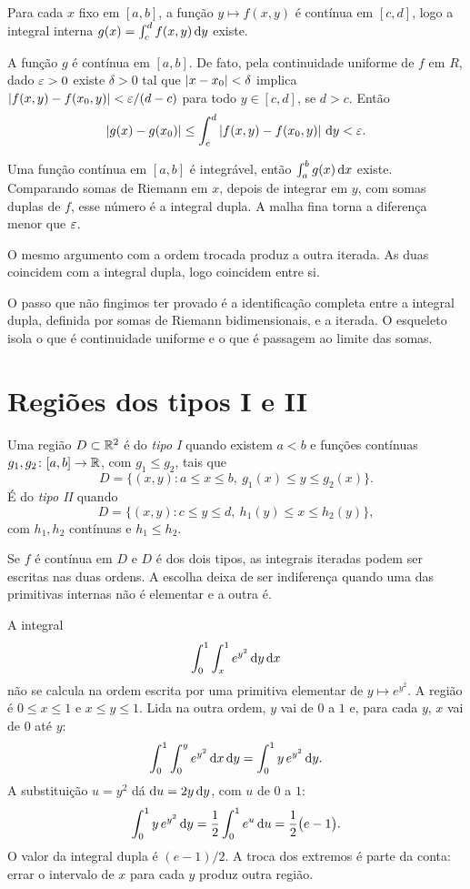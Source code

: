 \documentclass[11pt,a4paper]{article}
\begin{document}
\begin{esqueleto}
\item Para cada $x$ fixo em $[a,b]$, a função $y\mapsto f(x,y)$ é contínua em $[c,d]$, logo a integral interna $g(x)=\int_c^d f(x,y)\,\mathrm{d} y$ existe.
\item A função $g$ é contínua em $[a,b]$. De fato, pela continuidade uniforme de $f$ em $R$, dado $\varepsilon>0$ existe $\delta>0$ tal que $\left\lvert x-x_0 \right\rvert<\delta$ implica $\left\lvert f(x,y)-f(x_0,y) \right\rvert<\varepsilon/(d-c)$ para todo $y\in[c,d]$, se $d>c$. Então
\[
\left\lvert g(x)-g(x_0) \right\rvert\le\int_c^d\left\lvert f(x,y)-f(x_0,y) \right\rvert\,\mathrm{d} y<\varepsilon.
\]
\item Uma função contínua em $[a,b]$ é integrável, então $\int_a^b g(x)\,\mathrm{d} x$ existe. Comparando somas de Riemann em $x$, depois de integrar em $y$, com somas duplas de $f$, esse número é a integral dupla. A malha fina torna a diferença menor que $\varepsilon$.
\item O mesmo argumento com a ordem trocada produz a outra iterada. As duas coincidem com a integral dupla, logo coincidem entre si.
\end{esqueleto}

O passo que não fingimos ter provado é a identificação completa entre a integral dupla, definida por somas de Riemann bidimensionais, e a iterada. O esqueleto isola o que é continuidade uniforme e o que é passagem ao limite das somas.

\section{Regiões dos tipos I e II}

\begin{definicao}
Uma região $D\subset\mathbb{R}^2$ é do \emph{tipo I} quando existem $a<b$ e funções contínuas $g_1,g_2\colon[a,b]\to\mathbb{R}$, com $g_1\le g_2$, tais que
\[
D=\bigl\{(x,y):a\le x\le b,\ g_1(x)\le y\le g_2(x)\bigr\}.
\]
É do \emph{tipo II} quando
\[
D=\bigl\{(x,y):c\le y\le d,\ h_1(y)\le x\le h_2(y)\bigr\},
\]
com $h_1,h_2$ contínuas e $h_1\le h_2$.
\end{definicao}

Se $f$ é contínua em $D$ e $D$ é dos dois tipos, as integrais iteradas podem ser escritas nas duas ordens. A escolha deixa de ser indiferença quando uma das primitivas internas não é elementar e a outra é.

\begin{exemplo}
A integral
\[
\int_0^1\int_x^1 e^{y^2}\,\mathrm{d} y\,\mathrm{d} x
\]
não se calcula na ordem escrita por uma primitiva elementar de $y\mapsto e^{y^2}$. A região é $0\le x\le 1$ e $x\le y\le 1$. Lida na outra ordem, $y$ vai de $0$ a $1$ e, para cada $y$, $x$ vai de $0$ até $y$:
\[
\int_0^1\int_0^y e^{y^2}\,\mathrm{d} x\,\mathrm{d} y
=\int_0^1 y\,e^{y^2}\,\mathrm{d} y.
\]
A substituição $u=y^2$ dá $\mathrm{d} u=2y\,\mathrm{d} y$, com $u$ de $0$ a $1$:
\[
\int_0^1 y\,e^{y^2}\,\mathrm{d} y=\frac12\int_0^1 e^u\,\mathrm{d} u=\frac12\bigl(e-1\bigr).
\]
O valor da integral dupla é $(e-1)/2$. A troca dos extremos é parte da conta: errar o intervalo de $x$ para cada $y$ produz outra região.
\end{exemplo}
\end{document}
